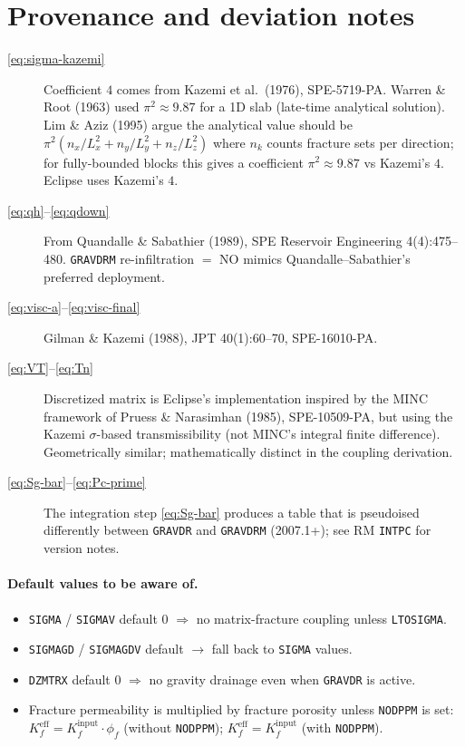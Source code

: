 \documentclass[11pt,a4paper]{article}
\newcommand{\kw}[1]{\texttt{#1}}
\begin{document}
\section{Provenance and deviation notes}

\begin{description}
  \item[\eqref{eq:sigma-kazemi}] Coefficient $4$ comes from Kazemi et al.\ (1976), SPE-5719-PA.
    Warren \& Root (1963) used $\pi^2 \approx 9.87$ for a 1D slab (late-time analytical solution).
    Lim \& Aziz (1995) argue the analytical value should be $\pi^2(n_x/L_x^2 + n_y/L_y^2 + n_z/L_z^2)$
    where $n_k$ counts fracture sets per direction; for fully-bounded blocks this gives a coefficient $\pi^2 \approx 9.87$ vs Kazemi's $4$.
    Eclipse uses Kazemi's $4$.
  \item[\eqref{eq:qh}--\eqref{eq:qdown}] From Quandalle \& Sabathier (1989), SPE Reservoir Engineering 4(4):475--480.
    \kw{GRAVDRM} re-infiltration $=$ NO mimics Quandalle--Sabathier's preferred deployment.
  \item[\eqref{eq:visc-a}--\eqref{eq:visc-final}] Gilman \& Kazemi (1988), JPT 40(1):60--70, SPE-16010-PA.
  \item[\eqref{eq:VT}--\eqref{eq:Tn}] Discretized matrix is Eclipse's implementation inspired by
    the MINC framework of Pruess \& Narasimhan (1985), SPE-10509-PA, but using the Kazemi $\sigma$-based
    transmissibility (not MINC's integral finite difference). Geometrically similar; mathematically distinct in the coupling derivation.
  \item[\eqref{eq:Sg-bar}--\eqref{eq:Pc-prime}] The integration step \eqref{eq:Sg-bar} produces a table that is
    pseudoised differently between \kw{GRAVDR} and \kw{GRAVDRM} (2007.1+); see RM \kw{INTPC} for version notes.
\end{description}

\paragraph{Default values to be aware of.}
\begin{itemize}
  \item \kw{SIGMA} / \kw{SIGMAV} default $0$ $\Rightarrow$ no matrix-fracture coupling unless \kw{LTOSIGMA}.
  \item \kw{SIGMAGD} / \kw{SIGMAGDV} default $\to$ fall back to \kw{SIGMA} values.
  \item \kw{DZMTRX} default $0$ $\Rightarrow$ no gravity drainage even when \kw{GRAVDR} is active.
  \item Fracture permeability is multiplied by fracture porosity unless \kw{NODPPM} is set:
        $K_f^{\text{eff}} = K_f^{\text{input}}\cdot\phi_f$ (without \kw{NODPPM});
        $K_f^{\text{eff}} = K_f^{\text{input}}$ (with \kw{NODPPM}).
\end{itemize}
\end{document}
